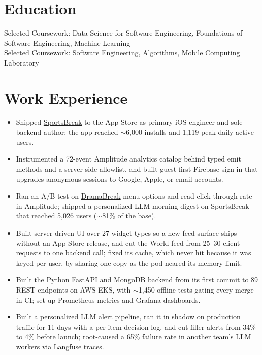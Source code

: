 \documentclass[11pt, letterpaper]{article}
\begin{document}

\section{Education}
Selected Coursework: Data Science for Software Engineering, Foundations of Software Engineering, Machine Learning\\[1pt]
Selected Coursework: Software Engineering, Algorithms, Mobile Computing Laboratory

\section{Work Experience}
\begin{itemize}
  \item Shipped \href{https://apps.apple.com/app/id6762649287}{SportsBreak} to the App Store as primary iOS engineer and sole backend author; the app reached $\sim$6{,}000 installs and 1{,}119 peak daily active users.
  \item Instrumented a 72-event Amplitude analytics catalog behind typed emit methods and a server-side allowlist, and built guest-first Firebase sign-in that upgrades anonymous sessions to Google, Apple, or email accounts.
  \item Ran an A/B test on \href{https://apps.apple.com/app/id6758861738}{DramaBreak} menu options and read click-through rate in Amplitude; shipped a personalized LLM morning digest on SportsBreak that reached 5{,}026 users ($\sim$81\% of the base).
  \item Built server-driven UI over 27 widget types so a new feed surface ships without an App Store release, and cut the World feed from 25--30 client requests to one backend call; fixed its cache, which never hit because it was keyed per user, by sharing one copy as the pod neared its memory limit.
  \item Built the Python FastAPI and MongoDB backend from its first commit to 89 REST endpoints on AWS EKS, with $\sim$1{,}450 offline tests gating every merge in CI; set up Prometheus metrics and Grafana dashboards.
  \item Built a personalized LLM alert pipeline, ran it in shadow on production traffic for 11 days with a per-item decision log, and cut filler alerts from 34\% to 4\% before launch; root-caused a 65\% failure rate in another team's LLM workers via Langfuse traces.
\end{itemize}
\end{document}
